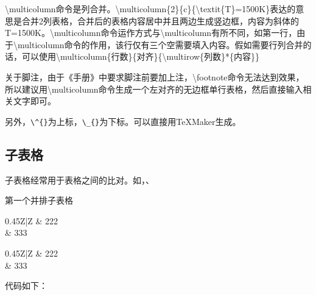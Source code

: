 \textbackslash multicolumn命令是列合并。\textbackslash multicolumn\{2\}\{\textbar c\textbar\}\{\textbackslash textit\{T\}=1500K\}表达的意思是合并2列表格，合并后的表格内容居中并且两边生成竖边框，内容为斜体的T=1500K。\textbackslash multicolumn命令运作方式与\textbackslash multicolumn有所不同，如第一行，由于\textbackslash multicolumn命令的作用，该行仅有三个空需要填入内容。假如需要行列合并的话，可以使用\textbackslash multicolumn\{行数\}\{对齐\}\{\textbackslash multirow\{列数\}*\{内容\}\}

关于脚注，由于《手册》中要求脚注前要加上注，\textbackslash footnote命令无法达到效果，所以建议用\textbackslash multicolumn命令生成一个左对齐的无边框单行表格，然后直接输入相关文字即可。

另外，\verb|\^{}|为上标，\verb|\_{}|为下标。可以直接用\TeX{}Maker生成。

\subsection{子表格}
子表格经常用于表格之间的比对。如，、

\begin{table}[htbp]
\noindent\begin{minipage}{0.45\textwidth}
\centering
\caption{第一个并排子表格}
\label{tab:parallel1}
\begin{tabularx}{0.45\textwidth}{Z|Z}
 & 222 \\ & 333 \\\bottomrule
\end{tabularx}
\end{minipage}
\begin{minipage}{0.45\textwidth}
\centering
\caption{第二个并排子表格}
\label{tab:parallel2}
\begin{tabularx}{0.45\textwidth}{Z|Z}
 & 222 \\ & 333 \\\bottomrule
\end{tabularx}
\end{minipage}
\end{table}

代码如下：

